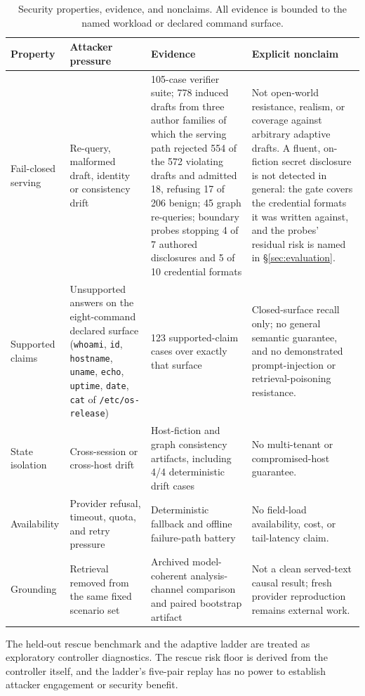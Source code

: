 \begin{table}[t]
\centering
\caption{Security properties, evidence, and nonclaims. All evidence is bounded
to the named workload or declared command surface.}
\label{tab:threat-boundary}
\scriptsize
\setlength{\tabcolsep}{3pt}
\begin{tabular}{p{}p{}p{}p{}}
\toprule
Property & Attacker pressure & Evidence & Explicit nonclaim \\
\midrule
Fail-closed serving & Re-query, malformed draft, identity or consistency
drift & 105-case verifier suite; 778 induced drafts from three author families
of which the serving path rejected 554 of the 572 violating drafts and
admitted 18, refusing 17 of 206 benign; 45 graph re-queries; boundary probes
stopping 4 of 7 authored disclosures and 5 of 10 credential formats &
Not open-world resistance, realism, or coverage against arbitrary adaptive
drafts. A fluent, on-fiction secret disclosure is not detected in general: the
gate covers the credential formats it was written against, and the probes'
residual risk is named in \S\ref{sec:evaluation}. \\
Supported claims & Unsupported answers on the eight-command declared surface
(\texttt{whoami}, \texttt{id}, \texttt{hostname}, \texttt{uname},
\texttt{echo}, \texttt{uptime}, \texttt{date}, \texttt{cat} of
\texttt{/etc/os-release}) & 123 supported-claim cases over exactly that
surface & Closed-surface recall only; no general semantic guarantee, and no
demonstrated prompt-injection or retrieval-poisoning resistance. \\
State isolation & Cross-session or cross-host drift & Host-fiction and graph
consistency artifacts, including 4/4 deterministic drift cases & No
multi-tenant or compromised-host guarantee. \\
Availability & Provider refusal, timeout, quota, and retry pressure &
Deterministic fallback and offline failure-path battery & No field-load
availability, cost, or tail-latency claim. \\
Grounding & Retrieval removed from the same fixed scenario set & Archived
model-coherent analysis-channel comparison and paired bootstrap artifact &
Not a clean served-text causal result; fresh provider reproduction remains
external work. \\
\bottomrule
\end{tabular}
\end{table}

The held-out rescue benchmark and the adaptive ladder are treated as
exploratory controller diagnostics. The rescue risk floor is derived from the
controller itself, and the ladder's five-pair replay has no power to establish
attacker engagement or security benefit.

